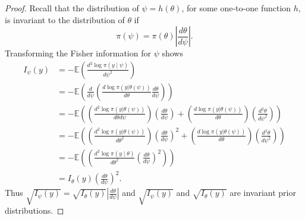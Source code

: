 \documentclass[
]{book}
\theoremstyle{definition}
\theoremstyle{definition}
\theoremstyle{definition}
\theoremstyle{definition}
\theoremstyle{remark}
\begin{document}
\begin{proof}
Recall that the distribution of \(\psi = h(\theta)\), for some one-to-one function \(h\), is invariant to the distribution of \(\theta\) if
\[
\pi(\psi) = \pi(\theta) \left|\frac{d\theta}{d\psi}\right|.
\]
Transforming the Fisher information for \(\psi\) shows
\begin{align*}
I_\psi({y}) &= - \mathbb{E}\left(\frac{d^2\log \pi({y} \mid \psi)}{d\psi^2}\right) \\
&= -\mathbb{E}\left(\frac{d}{d\psi} \left( \frac{d \log \pi(y|\theta(\psi))}{d \theta} \frac{d\theta}{d\psi} \right) \right) \tag{chain rule}\\
&= -\mathbb{E}\left(\left(\frac{d^2 \log \pi(y|\theta(\psi))}{d \theta d\psi}\right)\left( \frac{d\theta}{d\psi}\right) + \left(\frac{d \log \pi(y|\theta(\psi))}{d \theta}\right) \left( \frac{d^2\theta}{d\psi^2}\right) \right)\tag{prod. rule} \\
&= -\mathbb{E}\left(\left(\frac{d^2 \log \pi(y|\theta(\psi))}{d \theta^2 }\right)\left( \frac{d\theta}{d\psi}\right)^2 + \left(\frac{d \log \pi(y|\theta(\psi))}{d \theta}\right) \left( \frac{d^2\theta}{d\psi^2}\right) \right)\tag{chain rule} \\
& = -\mathbb{E}\left(\left(\frac{d^2 \log \pi({y} \mid \theta)}{d\theta^2}\left(\frac{d\theta}{d\psi}\right)^2\right)\right)  \\
& = I_\theta({y})\left(\frac{d\theta}{d\psi}\right)^2 .
\end{align*}
Thus \(\sqrt{I_\psi({y})} = \sqrt{I_\theta({y})} \left|\frac{d\theta}{d\psi}\right|\) and \(\sqrt{I_\psi({y})}\) and \(\sqrt{I_\theta({y})}\) are invariant prior distributions.
\end{proof}
\end{document}
